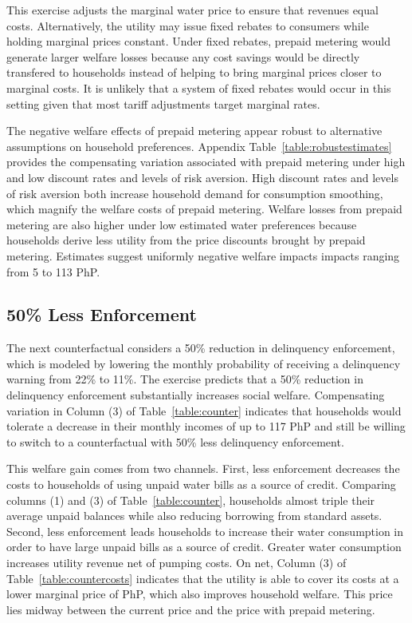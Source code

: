 \documentclass[12pt,table]{article}
\begin{document}
This exercise adjusts the marginal water price to ensure that revenues equal costs.  Alternatively, the utility may issue fixed rebates to consumers while holding marginal prices constant.  Under fixed rebates, prepaid metering would generate larger welfare losses because any cost savings would be directly transfered to households instead of helping to bring marginal prices closer to marginal costs.  It is unlikely that a system of fixed rebates would occur in this setting given that most tariff adjustments target marginal rates.

The negative welfare effects of prepaid metering appear robust to alternative assumptions on household preferences.  Appendix Table~\ref{table:robustestimates} provides the compensating variation associated with prepaid metering under high and low discount rates and levels of risk aversion.  High discount rates and levels of risk aversion both increase household demand for consumption smoothing, which magnify the welfare costs of prepaid metering.  Welfare losses from prepaid metering are also higher under low estimated water preferences because households derive less utility from the price discounts brought by prepaid metering.  Estimates suggest uniformly negative welfare impacts impacts ranging from 5 to 113 PhP.


\subsection{50\% Less Enforcement}
The next counterfactual considers a 50\% reduction in delinquency enforcement, which is modeled by lowering the monthly probability of receiving a delinquency warning from 22\% to 11\%.  The exercise predicts that a 50\% reduction in delinquency enforcement substantially increases social welfare.  Compensating variation in Column (3) of Table~\ref{table:counter} indicates that households would tolerate a decrease in their monthly incomes of up to 117 PhP and still be willing to switch to a counterfactual with 50\% less delinquency enforcement.  

This welfare gain comes from two channels.  First, less enforcement decreases the costs to households of using unpaid water bills as a source of credit.  Comparing columns (1) and (3) of Table~\ref{table:counter}, households almost triple their average unpaid balances while also reducing borrowing from standard assets.  Second, less enforcement leads households to increase their water consumption in order to have large unpaid bills as a source of credit.  Greater water consumption increases utility revenue net of pumping costs.  On net, Column (3) of Table~\ref{table:countercosts} indicates that the utility is able to cover its costs at a lower marginal price of PhP, which also improves household welfare.  This price lies midway between the current price and the price with prepaid metering.
\end{document}
